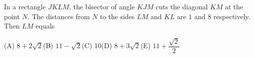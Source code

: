 In a rectangle $JKLM$, the bisector of angle $KJM$ cuts the diagonal $KM$ at the point $N$. The distances from $N$ to the sides $LM$ and $KL$ are $1$ and $8$ respectively. Then $LM$ equals

(A) $8+2\sqrt2$\quad (B) $11-\sqrt2$\quad (C) $10$\quad (D) $8+3\sqrt2$\quad (E) $11+\dfrac{\sqrt2}{2}$
